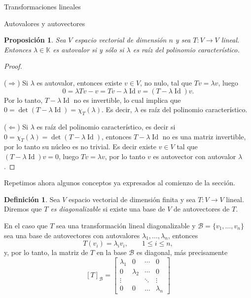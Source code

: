 \documentclass[a4paper,12pt,twoside,spanish,reqno]{amsbook}
\numberwithin{equation}{section}
\newtheorem{proposicion}[teorema]{Proposici\'on}
\theoremstyle{definition}
\newtheorem{definicion}[teorema]{Definici\'on}
\theoremstyle{remark}
\newcommand{\Id}{\operatorname{Id}}
\newcommand{\K}{\mathbb K}
\begin{document}
\begin{chapter}{Transformaciones lineales}
\begin{section}{Autovalores y autovectores}
    

        
        \begin{proposicion}\label{autovalores}
            Sea $V$ espacio vectorial de dimensión $n$ y sea $T: V \to V$ lineal. Entonces $\lambda\in \K$ es autovalor si y sólo si $\lambda$ es raíz del polinomio característico.  
        \end{proposicion}
        \begin{proof}${}^{}$
            
            ($\Rightarrow$) Si $\lambda$ es autovalor, entonces existe $v \in V$, no nulo, tal que $Tv = \lambda v$, luego 
            $$
            0 = \lambda Tv -v  =   Tv - \lambda \Id v =  (T-\lambda \Id)v.
            $$
            Por lo tanto, $T-\lambda \Id$ no es invertible, lo cual implica que $0 = \det(T-\lambda \Id) = \chi_T(\lambda)$. Es decir, $\lambda$ es raíz del polinomio característico. 
            
            ($\Leftarrow$) Si $\lambda$ es raíz del polinomio característico, es decir si $0 = \chi_T(\lambda) = \det(T-\lambda \Id)$, entonces $T-\lambda \Id$ no es una matriz invertible, por lo tanto  su núcleo es no trivial. Es decir existe $v \in V$ tal que $(T-\lambda \Id)v =0$, luego $Tv =\lambda v$, por lo tanto $v$ es autovector con autovalor $\lambda$.   
        \end{proof}
        
        Repetimos ahora algunos conceptos ya expresados al comienzo de la sección. 
        
        \begin{definicion}
            Sea $V$ espacio vectorial de dimensión finita y sea $T: V \to V$ lineal. Diremos que \textit{$T$ es diagonalizable} si existe una base de $V$ de autovectores de $T$. 
        \end{definicion}	
        
        En el caso que $T$ sea una transformación lineal diagonalizable y $\mathcal{B} = \{v_1,\ldots,v_n \}$ sea una base de autovectores con autovalores $\lambda_1,\ldots,\lambda_n$, entonces
        $$
        T(v_i) = \lambda_i v_i, \qquad 1 \le i \le n,
        $$ 
        y, por lo tanto, la matriz de $T$ en  la base $\mathcal{B}$ es diagonal, más precisamente
        $$
        [T]_\mathcal{B} = \begin{bmatrix}
        \lambda_1 &0 & \cdots & 0 \\
        0 & \lambda_2 & \cdots &0 \\
        \vdots & &\ddots & \vdots \\
        0 & 0 & \ldots &\lambda_n
        \end{bmatrix}
        $$
        

\end{section}
\end{chapter}
\end{document}
